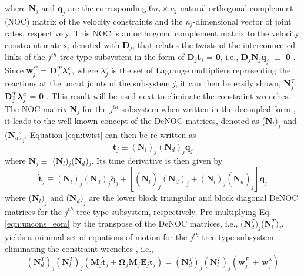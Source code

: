 where \textbf{N}$_j$ and $\dot{\textbf{q}}_j$ are the corresponding 6\emph{n}$_j\times$\emph{n}$_j$ natural orthogonal complement (NOC) matrix of the velocity constraints \citep{angeles1988dynamic} and the \emph{n}$_j$-dimensional vector of joint rates, respectively. This NOC is an orthogonal complement matrix to the velocity constraint matrix, denoted with \textbf{D}$_j$, that relates the twists of the interconnected links of the $j^{th}$ tree-type subsystem  in the form of \textbf{D}$_j$\textbf{t}$_j$ = \textbf{0}, i.e., \textbf{D}$_j$\textbf{N}$_j\dot{\textbf{q}}_j$ $\equiv$ \textbf{0} \citep{sahaphdthesis}. Since \textbf{w}$^C_j$ = \textbf{D}$_j^T\mbox{\boldmath$\lambda$}^c_j$, where \mbox{\boldmath$\lambda$}$^c_j$ is the set of Lagrange multipliers representing the reactions at the uncut joints of the subsystem \emph{j}, it can then be easily shown, \textbf{N}$^T_j$\textbf{D}$^T_j\mbox{\boldmath$\lambda$}^c_j$ = \textbf{0} \citep{angeles1997fundamentals}. This result will be used next to eliminate the constraint wrenches. The NOC matrix \textbf{N}$_j$ for the $j^{th}$ subsystem when written in the decoupled form \citep{saha1999dynamics}, it leads to the well known concept of the DeNOC matrices, denoted as (\textbf{N}$_l)_j$ and (\textbf{N}$_d)_j$. Equation \ref{eqn:twist} can then be re-written as 
\begin{equation}
\label{eqn:twistdenoc}
\textbf{t}_j \equiv (\textbf{N}_l)_j(\textbf{N}_d)_j\dot{\textbf{q}}_j
\end{equation} 
where \textbf{N}$_j \equiv$ (\textbf{N}$_l$)$_j$(\textbf{N}$_d$)$_j$. Its time derivative is then given by
\begin{equation}
\label{eqn:twistratedenoc}
\dot{\textbf{t}}_j \equiv (\textbf{N}_l)_j(\textbf{N}_d)_j\ddot{\textbf{q}}_j + [(\dot{\textbf{N}}_l)_j(\textbf{N}_d)_j + (\textbf{N}_l)_j(\dot{\textbf{N}}_d)_j]\dot{\textbf{q}}_j
\end{equation} 
where (\textbf{N}$_l)_j$ and (\textbf{N}$_d)_j$ are the lower block triangular and block diagonal DeNOC matrices for the $j^{th}$ tree-type subsystem, respectively. Pre-multiplying Eq. \ref{eqn:uncons_eom} by the transpose of the DeNOC matrices, i.e., (\textbf{N}$_d^T)_j$(\textbf{N}$_l^T)_j$, yields a minimal set of equations of motion for the $j^{th}$ tree-type subsystem eliminating the constraint wrenches \citep{chaudhary2008dynamics}, i.e.,
\begin{equation}
\label{eqn:premult_eom}
(\textbf{N}_d^T)_j(\textbf{N}_l^T)_j(\textbf{M}_j\dot{\textbf{t}}_j + \mathbf{\Omega}_j\textbf{M}_j\textbf{E}_j\textbf{t}_j) = (\textbf{N}_d^T)_j(\textbf{N}_l^T)_j(\textbf{w$_j^E$ + w$_j^\lambda$})
\end{equation}

